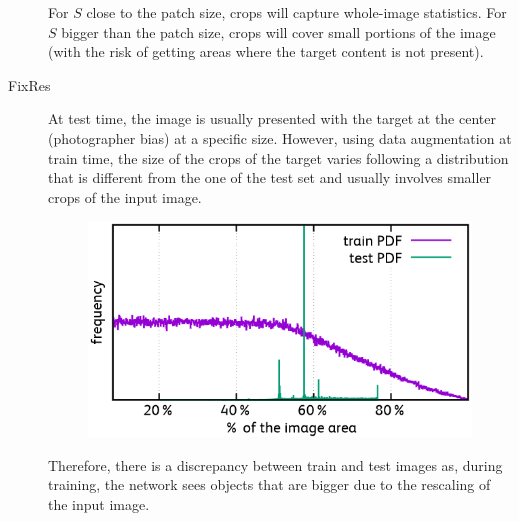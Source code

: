\begin{description}
        \begin{remark}
            For $S$ close to the patch size, crops will capture whole-image statistics.
            For $S$ bigger than the patch size, crops will cover small portions of the image (with the risk of getting areas where the target content is not present).
        \end{remark}

    \item[FixRes] 
        At test time, the image is usually presented with the target at the center (photographer bias) at a specific size. 
        However, using data augmentation at train time, the size of the crops of the target varies following a distribution that is different from the one of the test set and usually involves smaller crops of the input image.

        \begin{figure}[H]
            \centering
            \includegraphics[width=0.35\linewidth]{./img/fixres1.png}
        \end{figure}

        Therefore, there is a discrepancy between train and test images as, during training, the network sees objects that are bigger due to the rescaling of the input image.


\end{description}
